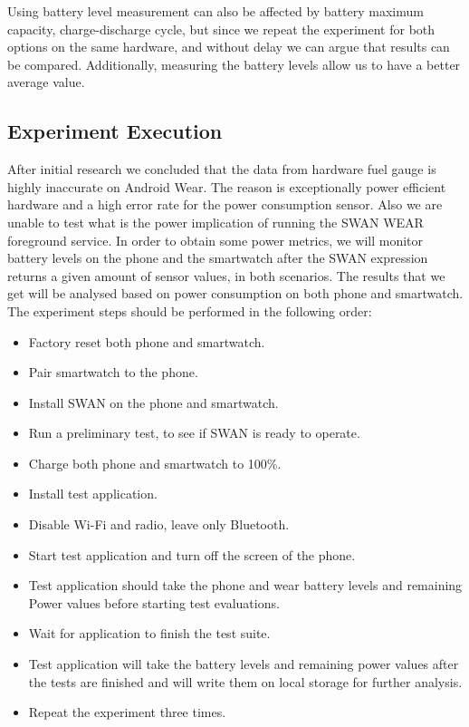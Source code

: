  Using battery level measurement can also be affected by battery maximum capacity, charge-discharge cycle, but since we repeat the experiment for both options on the same hardware, and without delay we can argue that results can be compared.
 Additionally, measuring the battery levels allow us to have a better average value.
 
 \subsection{Experiment Execution}
 After initial research we concluded that the data from hardware fuel gauge is highly inaccurate on Android Wear.
 The reason is exceptionally power efficient hardware and a high error rate for the power consumption sensor. 
 Also we are unable to test what is the power implication of running the SWAN WEAR foreground service. 
 In order to obtain some power metrics, we will monitor battery levels on the phone and the smartwatch after the SWAN expression returns a given amount of sensor values, in both scenarios.
The results that we get will be analysed based on power consumption on both phone and smartwatch.
The experiment steps should be performed in the following order:
\begin{itemize}
 \item Factory reset both phone and smartwatch.
 \item Pair smartwatch to the phone.
 \item Install SWAN on the phone and smartwatch.
 \item Run a preliminary test, to see if SWAN is ready to operate.
 \item Charge both phone and smartwatch to 100\%.
 \item Install test application.
 \item Disable Wi-Fi and radio, leave only Bluetooth.
 \item Start test application and turn off the screen of the phone.
 \item Test application should take the phone and wear battery levels and remaining Power values before starting test evaluations.
 \item Wait for application to finish the test suite.
 \item Test application will take the battery levels and remaining power values after the tests are finished and will write them on local storage for further analysis.
 \item Repeat the experiment three times.
\end{itemize}

